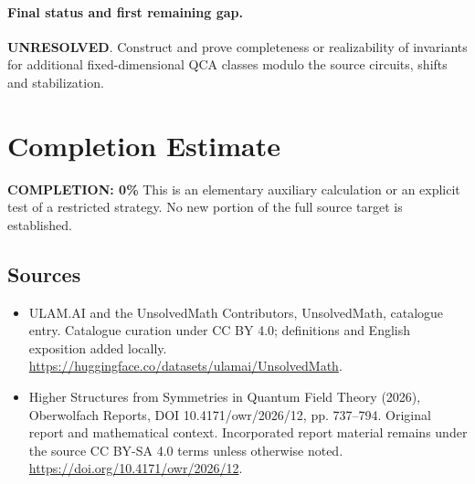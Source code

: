 \documentclass[11pt]{article}
\begin{document}
\paragraph{Final status and first remaining gap.}
\textbf{UNRESOLVED}. Construct and prove completeness or realizability of invariants for additional fixed-dimensional QCA classes modulo the source circuits, shifts and stabilization.

\section{Completion Estimate}
\noindent\textbf{COMPLETION: 0\%}
This is an elementary auxiliary calculation or an explicit test of a restricted strategy. No new portion of the full source target is established.

\subsection{Sources}
\begin{itemize}
\item[\hypertarget{source:statement:1}{S1}] ULAM.AI and the UnsolvedMath Contributors, UnsolvedMath, catalogue entry. Catalogue curation under CC BY 4.0; definitions and English exposition added locally.
\url{https://huggingface.co/datasets/ulamai/UnsolvedMath}.
\item[\hypertarget{source:statement:2}{S2}] Higher Structures from Symmetries in Quantum Field Theory (2026), Oberwolfach Reports, DOI 10.4171/owr/2026/12, pp. 737--794. Original report and mathematical context. Incorporated report material remains under the source CC BY-SA 4.0 terms unless otherwise noted.
\url{https://doi.org/10.4171/owr/2026/12}.
\end{itemize}
\label{end:statement}
\end{document}
